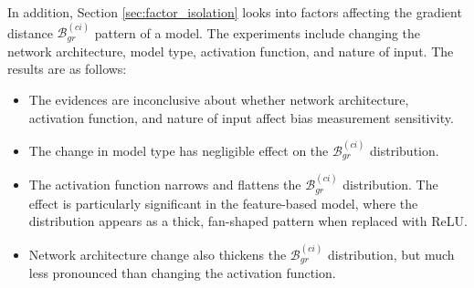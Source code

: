 In addition, Section \ref{sec:factor_isolation} looks into factors affecting the gradient distance $\mathcal{B}_{gr}^{(ci)}$ pattern of a model. The experiments include changing the network architecture, model type, activation function, and nature of input. The results are as follows:

\begin{itemize}
    \item The evidences are inconclusive about whether network architecture, activation function, and nature of input affect bias measurement sensitivity.
    \item The change in model type has negligible effect on the $\mathcal{B}_{gr}^{(ci)}$ distribution.
    \item The activation function narrows and flattens the $\mathcal{B}_{gr}^{(ci)}$ distribution. The effect is particularly significant in the feature-based model, where the distribution appears as a thick, fan-shaped pattern when replaced with ReLU.
    \item Network architecture change also thickens the $\mathcal{B}_{gr}^{(ci)}$ distribution, but much less pronounced than changing the activation function.
\end{itemize}


